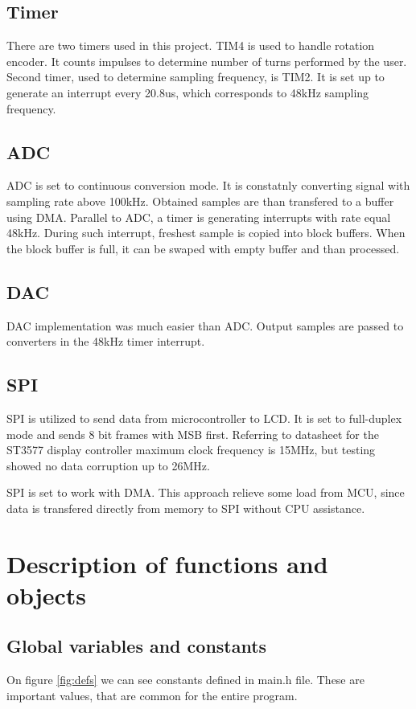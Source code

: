 \documentclass[a4paper,twoside,12pt]{book}
\begin{document}
\subsection{Timer}
There are two timers used in this project.
TIM4 is used to handle rotation encoder.
It counts impulses to determine number of turns 
performed by the user.
Second timer, used to determine sampling frequency, is TIM2.
It is set up to generate an interrupt every 20.8us,
which corresponds to 48kHz sampling frequency.

\subsection{ADC}
ADC is set to continuous conversion mode.
It is constatnly converting signal with sampling rate above 100kHz.
Obtained samples are than transfered to a buffer using DMA.
Parallel to ADC, a timer is generating interrupts
with rate equal 48kHz. During such interrupt,
freshest sample is copied into block buffers. 
When the block buffer is full, it can be swaped with empty buffer
and than processed.

\subsection{DAC}
DAC implementation was much easier than ADC.
Output samples are passed to converters in the 48kHz timer interrupt.

\subsection{SPI}
SPI is utilized to send data from microcontroller to LCD.
It is set to full-duplex mode and sends 8 bit frames with MSB first.
Referring to datasheet for the ST3577 display controller
maximum clock frequency is 15MHz,
but testing showed no data corruption up to 26MHz.
\cite{Sitronix:ST7735}

SPI is set to work with DMA.
This approach relieve some load from MCU,
since data is transfered directly from memory
to SPI without CPU assistance.

\section{Description of functions and objects}

\subsection{Global variables and constants}
On figure \ref{fig:defs} we can see constants defined in main.h file.
These are important values, that are common for the entire program.
\end{document}
